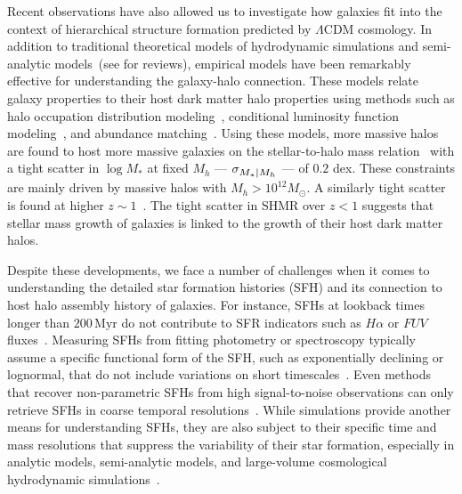 \documentclass[12pt, letterpaper, preprint, tighten]{aastex62}
\newcommand{\siglogm}{\sigma_{\scaleto{M_*|M_h}{8pt}}}
\begin{document}
Recent observations have also allowed us to investigate how galaxies fit
into the context of hierarchical structure formation predicted by 
$\Lambda$CDM cosmology. In addition to traditional theoretical
models of hydrodynamic simulations and semi-analytic models~(see \citealt{silk2012, somerville2015} for reviews),
empirical models have been remarkably effective for understanding the 
galaxy-halo connection. These models relate galaxy properties to their 
host dark matter halo properties using methods such as halo occupation 
distribution modeling~\citep[HOD; \emph{e.g.}][]{zheng2007,zehavi2011,leauthaud2012,parejko2013,zu2015},
conditional luminosity function modeling~\citep[\emph{e.g.}][]{yang2009}, 
and abundance matching~\citep[\emph{e.g.}][]{kravtsov2004, vale2006, conroy2009, moster2013, reddick2013}.
Using these models, more massive halos are found to host more massive 
galaxies on the stellar-to-halo mass relation~\citep[hereafter SHMR;][]{mandelbaum2006a, conroy2007, more2011, leauthaud2012, tinker2013, velander2014, han2015, zu2015, gu2016, lange2018a} 
with a tight scatter in $\log M_*$ at fixed $M_h$ --- $\siglogm$ --- of $0.2$ dex. 
These constraints are mainly driven by massive halos with $M_h > 10^{12} M_\odot$. 
A similarly tight scatter is found at higher $z\sim1$~\citep{leauthaud2012, tinker2013, patel2015}.
The tight scatter in SHMR over $z < 1$ suggests that stellar mass growth of 
galaxies is linked to the growth of their host dark matter halos.

Despite these developments, we face a number of challenges when it comes
to understanding the detailed star formation histories (SFH) and its
connection to host halo assembly history of galaxies.
For instance, SFHs at lookback times longer than $200\,\mathrm{Myr}$
do not contribute to SFR indicators such as $H\alpha$ or $FUV$ fluxes~\citep{sparre2017}.
Measuring SFHs from fitting photometry or spectroscopy typically
assume a specific functional form of the SFH, such as exponentially
declining or lognormal, that do not include variations on short
timescales~\citep[\emph{e.g.}][]{wilkinson2017, carnall2018}.
Even methods that recover non-parametric SFHs from high signal-to-noise
observations can only retrieve SFHs in coarse temporal resolutions~\citep[\emph{e.g.}][]{tojeiro2009, leja2018a}.
While simulations provide another means for understanding SFHs,
they are also subject to their specific time and mass resolutions that
suppress the variability of their star formation, especially in
analytic models, semi-analytic models, and large-volume cosmological
hydrodynamic simulations~\citep[][see also Figure~\ref{fig:illsfh}]{sparre2017}. %
\end{document}
